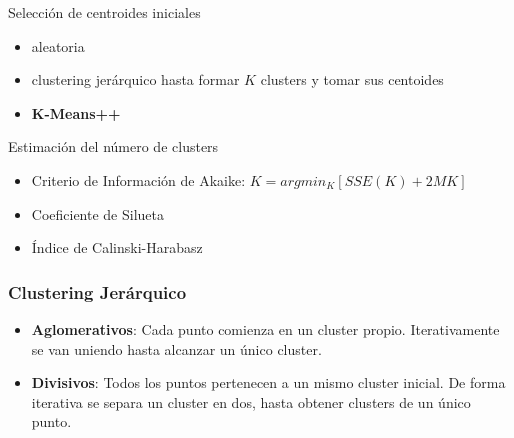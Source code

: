 \begin{frame}

    \begin{block}{Selección de centroides iniciales}
        \begin{itemize}
            \item<2-> aleatoria
            \item<3-> clustering jerárquico hasta formar $K$ clusters y tomar sus centoides
            \item<4-> \textbf{K-Means++}
        \end{itemize}
    \end{block}

    \pause
    \begin{block}{Estimación del número de clusters}
        \begin{itemize}
            \item<5-> Criterio de Información de Akaike: $K=argmin_{K}[SSE(K)+2M K]$
            \item<6-> Coeficiente de Silueta
            \item<7-> Índice de Calinski-Harabasz
        \end{itemize}
    \end{block}

\end{frame}

\begin{frame}
    \frametitle{Clustering Jerárquico}

    \begin{itemize}
        \item<2-> \textbf{Aglomerativos}: Cada punto comienza en un cluster propio.
        Iterativamente se van uniendo hasta alcanzar un único cluster.
        \item<3-> \textbf{Divisivos}: Todos los puntos pertenecen a un mismo cluster inicial.
        De forma iterativa se separa un cluster en dos, hasta obtener clusters de un único punto.
    \end{itemize}

\end{frame}

